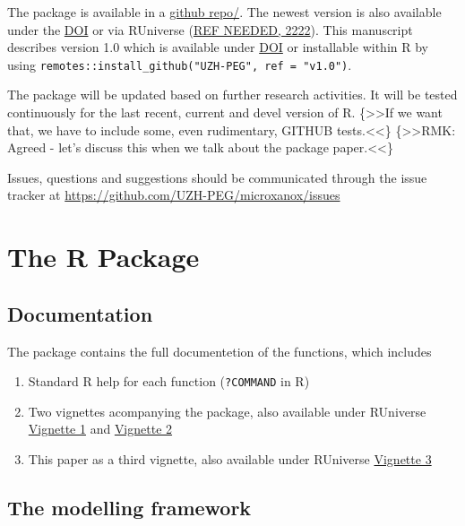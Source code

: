 \documentclass[
]{article}
\providecommand{\tightlist}{%
  \setlength{\itemsep}{0pt}\setlength{\parskip}{0pt}}
\begin{document}
The package is available in a \href{https://github.com/UZH-PEG/microxanox/}{github repo/}. The newest version is also available under the \href{https://DOI}{DOI} or via RUniverse (\protect\hyperlink{ref-REF_NEEDED}{REF NEEDED, 2222}). This manuscript describes version 1.0 which is available under \href{https://DOI}{DOI} or installable within R by using \texttt{remotes::install\_github("UZH-PEG",\ ref\ =\ "v1.0")}.

The package will be updated based on further research activities. It will be tested continuously for the last recent, current and devel version of R.
\{\textgreater\textgreater If we want that, we have to include some, even rudimentary, GITHUB tests.\textless\textless\}
\{\textgreater\textgreater RMK: Agreed - let's discuss this when we talk about the package paper.\textless\textless\}

Issues, questions and suggestions should be communicated through the issue tracker at \url{https://github.com/UZH-PEG/microxanox/issues}

\hypertarget{the-r-package}{%
\section{The R Package}\label{the-r-package}}

\hypertarget{documentation}{%
\subsection{Documentation}\label{documentation}}

The package contains the full documentetion of the functions, which includes

\begin{enumerate}
\def\labelenumi{\arabic{enumi}.}
\tightlist
\item
  Standard R help for each function (\texttt{?COMMAND} in R)
\item
  Two vignettes acompanying the package, also available under RUniverse \href{@LINK_NEEDED}{Vignette 1} and \href{@LINK_NEEDED}{Vignette 2}
\item
  This paper as a third vignette, also available under RUniverse \href{@LINK_NEEDED}{Vignette 3}
\end{enumerate}

\hypertarget{the-modelling-framework}{%
\subsection{The modelling framework}\label{the-modelling-framework}}
\end{document}
